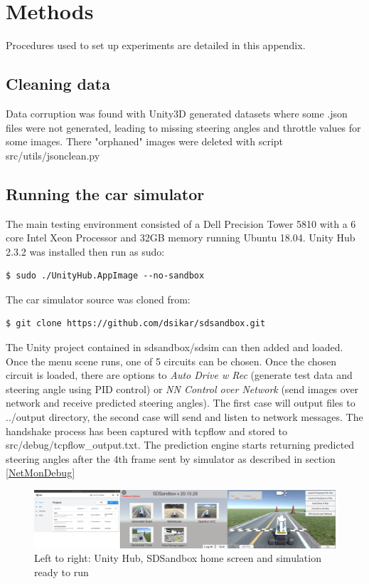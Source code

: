 \label{AppendixA-methods} %
\chapter{Methods} %

Procedures used to set up experiments are detailed in this appendix.

\section{Cleaning data}

Data corruption was found with Unity3D generated datasets where some .json files were not generated, leading to missing steering angles and throttle values for some images. There "orphaned" images were deleted with script src/utils/jsonclean.py

\section{Running the car simulator}
\label{RunningCarSimulatorForInference}

The main testing environment consisted of a Dell Precision Tower 5810 with a 6 core Intel Xeon Processor and 32GB memory running Ubuntu 18.04. Unity Hub 2.3.2 was installed then run as sudo:
\begin{verbatim}
$ sudo ./UnityHub.AppImage --no-sandbox 
\end{verbatim}
The car simulator source was cloned from:
\begin{verbatim}
$ git clone https://github.com/dsikar/sdsandbox.git    
\end{verbatim}
The Unity project contained in sdsandbox/sdsim can then added and loaded.
Once the menu scene runs, one of 5 circuits can be chosen. Once the chosen circuit is loaded, there are options to \textit{Auto Drive w Rec} (generate test data and steering angle using PID control) or \textit{NN Control over Network} (send images over network and receive predicted steering angles). The first case will output files to ../output directory, the second case will send and listen to network messages. The handshake process has been captured with tcpflow and stored to  src/debug/tcpflow\_output.txt. The prediction engine starts returning predicted steering angles after the 4th frame sent by simulator as described in section \ref{NetMonDebug}

\begin{figure}[ht]
 \centering 
 \includegraphics[scale=0.17]{Figures/UnityHubSDSandbox3in1.png}
 \caption{Left to right: Unity Hub, SDSandbox home screen and simulation ready to run}
 \label{fig:SDSandboxHome}
\end{figure}



